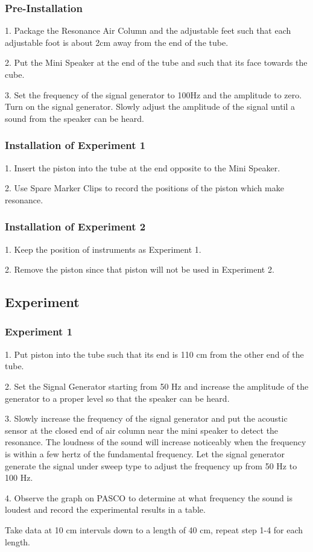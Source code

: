 \documentclass[12pt]{article}
\begin{document}
 	\subsubsection{Pre-Installation}
 	1. Package the Resonance Air Column and the adjustable feet such that each adjustable foot is about 2cm away from the end of the tube. \par 
 	2. Put the Mini Speaker at the end of the tube and such that its face towards the cube. \par 
 	3. Set the frequency of the signal generator to 100Hz and the amplitude to zero. Turn on the signal generator. Slowly adjust the amplitude of the signal until a sound from the speaker can be heard.
 	\subsubsection{Installation of Experiment 1}
 	1. Insert the piston into the tube at the end opposite to the Mini Speaker. \par
 	2. Use Spare Marker Clips to record the positions of the piston which make resonance. 
 	\subsubsection{Installation of Experiment 2}
 	1. Keep the position of instruments as Experiment 1. \par 
 	2. Remove the piston since that piston will not be used in Experiment 2.
 	\subsection{Experiment}
 	\subsubsection{Experiment 1}
 	1. Put piston into the tube such that its end is 110 cm from the other end of the tube. \par 
 	2. Set the Signal Generator starting from 50 Hz and increase the amplitude of the generator to a proper level so that the speaker can be heard.\par 
 	3. Slowly increase the frequency of the signal generator and put the acoustic sensor at the closed end of air column near the mini speaker to detect the resonance. The loudness of the sound will increase noticeably when the frequency is within a few hertz of the fundamental frequency. Let the signal generator generate the signal under sweep type to adjust the frequency up from 50 Hz to 100 Hz. \par
 	4. Observe the graph on PASCO to determine at what frequency the sound is loudest and record the experimental results in a table. \par
 	Take data at 10 cm intervals down to a length of 40 cm, repeat step 1-4 for each length.
\end{document}
